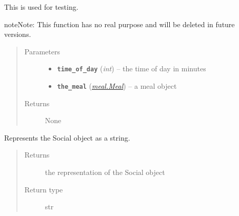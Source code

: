 \documentclass[letterpaper,10pt,english]{sphinxmanual}
\begin{document}
\begin{fulllineitems}
\begin{fulllineitems}
\begin{quote}
\begin{description}
\end{description}\end{quote}

\end{fulllineitems}


\begin{fulllineitems}
\label{social:social.Social.test_func}
This is used for testing.

\begin{notice}{note}{Note:}
This function has no real purpose and will be deleted in future versions.
\end{notice}
\begin{quote}\begin{description}
\item[{Parameters}] \leavevmode\begin{itemize}
\item {} 
\textbf{\texttt{time\_of\_day}} (\emph{int}) -- the time of day in minutes

\item {} 
\textbf{\texttt{the\_meal}} ({\hyperref[meal:meal.Meal]{\emph{\emph{meal.Meal}}}}) -- a meal object

\end{itemize}

\item[{Returns}] \leavevmode
None

\end{description}\end{quote}

\end{fulllineitems}


\begin{fulllineitems}
\label{social:social.Social.toString}
Represents the Social object as a string.
\begin{quote}\begin{description}
\item[{Returns}] \leavevmode
the representation of the Social object

\item[{Return type}] \leavevmode
str

\end{description}\end{quote}

\end{fulllineitems}


\end{fulllineitems}
\end{document}
